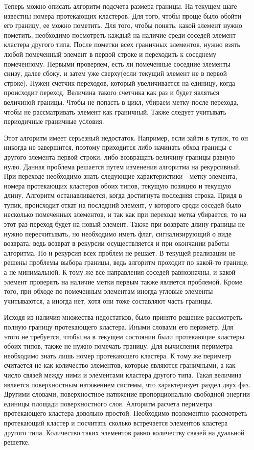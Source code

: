 \documentclass[14pt]{article}
\begin{document}
\par Теперь можно описать алгоритм подсчета размера границы. На текущем шаге известны номера протекающих кластеров. Для того, чтобы проще было обойти его границу, ее можно пометить. Для того, чтобы понять, какой элемент нужно пометить, необходимо посмотреть каждый на наличие среди соседей элемент кластера другого типа. После пометки всех граничных элементов, нужно взять любой помеченный элемент в первой строке и переходить к соседнему помеченному. Первыми проверяем, есть ли помеченные соседние элементы снизу, далее сбоку, и затем уже сверху(если текущий элемент не в первой строке). Нужен счетчик переходов, который увеличивается на единицу, когда происходит переход. Величина такого счетчика как раз и будет являться величиной границы. Чтобы не попасть в цикл, убираем метку после перехода, чтобы не рассматривать элемент как граничный. Также следует учитывать периодичные граничные условия.
\par Этот алгоритм имеет серьезный недостаток. Например, если зайти в тупик, то он никогда не завершится, поэтому приходится либо начинать обход границы с другого элемента первой строки, либо возвращать величину границы равную нулю. Данная проблема решается путем изменения алгоритма на рекурсивный. При переходе необходимо знать следующие характеристики - метку элемента, номера протекающих кластеров обоих типов, текущую позицию и текущую длину. Алгоритм останавливается, когда достигнута последняя строка. Придя в тупик, происходит откат на последний элемент, у которого среди соседей было несколько помеченных элементов, и так как при переходе метка убирается, то на этот раз переход будет на новый элемент. Также при возврате длину границы не нужно пересчитывать, но необходимо иметь флаг, сигнализирующий о виде возврата, ведь возврат в рекурсии осуществляется и при окончании работы алгоритма. Но и рекурсия всех проблем не решает. В текущей реализации не решены проблемы выбора границы, ведь алгоритм проходит по какой-то границе, а не минимальной. К тому же все направления соседей равнозначны, и какой элемент проверять на наличие метки первым также является проблемой. Кроме того, при обходе по помеченным элементам иногда угловые элементы учитываются, а иногда нет, хотя они тоже составляют часть границы.
\par Исходя из наличия множества недостатков, было принято решение рассмотреть полную границу протекающего кластера. Иными словами его периметр. Для этого не требуется, чтобы на в текущем состоянии были протекающие кластеры обоих типов, также не нужно помечать границу. Для вычисления периметра необходимо знать лишь номер протекающего кластера. К тому же периметр считается не как количество элементов, которые являются граничными, а как число связей между ними и элементами кластера другого типа. Такая величина является поверхностным натяжением системы, что характеризует раздел двух фаз. Другими словами, поверхностное натяжение пропорционально свободной энергии единицы площади поверхностного слоя. Алгоритм расчета периметра протекающего кластера довольно простой. Необходимо поэлементно рассмотреть протекающий кластер и посчитать сколько встречается элементов кластера другого типа. Количество таких элементов равно количеству связей на дуальной решетке.
\end{document}
